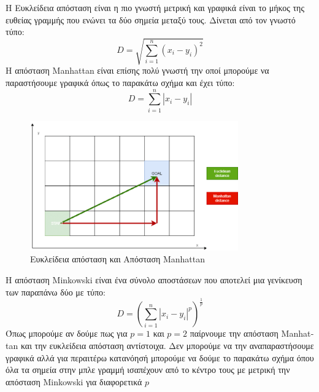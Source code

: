 Η Ευκλείδεια απόσταση είναι η πιο γνωστή μετρική και γραφικά είναι το μήκος της ευθείας γραμμής
που ενώνει τα δύο σημεία μεταξύ τους. Δίνεται από τον γνωστό τύπο:
$$D=\sqrt{\sum\limits_{i=1}^{n}(x_i-y_i)^2}$$
Η απόσταση \textlatin{Manhattan} είναι επίσης πολύ γνωστή την οποί μπορούμε να
παραστήσουμε γραφικά όπως το παρακάτω σχήμα και έχει τύπο:
$$D=\sum\limits_{i=1}^{n}\left\lvert x_i-y_i\right\rvert$$
\begin{figure}[H]
    \centering
    \includegraphics[width=0.8\textwidth]{images/manhattanDistance.png}
    \caption{Ευκλείδεια απόσταση και Απόσταση \textlatin{Manhattan}}
\end{figure}
Η απόσταση \textlatin{Minkowski} είναι ένα σύνολο αποστάσεων που αποτελεί μια γενίκευση των
παραπάνω δύο με τύπο:
$$D=\left(\sum\limits_{i=1}^{n}\left\lvert x_i-y_i\right\rvert^p\right)^{\frac{1}{p}}$$
Όπως μπορούμε αν δούμε πως για $p=1$ και $p=2$ παίρνουμε την απόσταση \textlatin{Manhattan} και
την ευκλείδεια απόσταση αντίστοιχα. Δεν μπορούμε να την αναπαραστήσουμε γραφικά αλλά για περαιτέρω
κατανόησή μπορούμε να δούμε το παρακάτω σχήμα όπου όλα τα σημεία στην μπλε γραμμή ισαπέχουν από το
κέντρο τους με μετρική την απόσταση \textlatin{Minkowski} για διαφορετικά $p$
